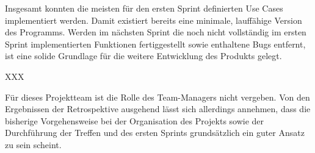 Insgesamt konnten die meisten für den ersten Sprint definierten Use Cases implementiert werden. Damit existiert bereits eine minimale, lauffähige Version des Programms. Werden im nächsten Sprint die noch nicht vollständig im ersten Sprint implementierten Funktionen fertiggestellt sowie enthaltene Bugs entfernt, ist eine solide Grundlage für die weitere Entwicklung des Produkts gelegt.
\nsecend

XXX
\nsecend

Für dieses Projektteam ist die Rolle des Team-Managers nicht vergeben. Von den Ergebnissen der Retrospektive ausgehend lässt sich allerdings annehmen, dass die bisherige Vorgehensweise bei der Organisation des Projekts sowie der Durchführung der Treffen und des ersten Sprints grundsätzlich ein guter Ansatz zu sein scheint. 
\nsecend

